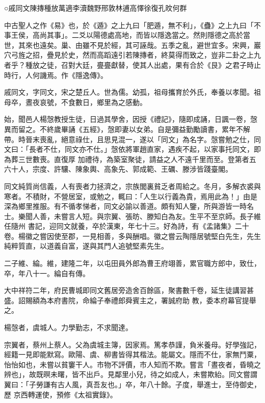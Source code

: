 
\begin{pinyinscope}

 ○戚同文陳摶種放萬適李瀆魏野邢敦林逋高懌徐復孔旼何群



 中古聖人之作《易》也，於《遁》之上九曰「肥遁，無不利」，《蠱》之上九曰「不事王侯，高尚其事」。二爻以陽德處高地，而皆以隱逸當之。然則隱德之高於當世，其來也遠矣。巢、由雖不見於經，其可誣哉。五季之亂，避世宜多。宋興，巖穴弓旌之招，疊見於史，然而高蹈遠引若陳摶者，終莫得而致之，豈非二卦之上九者乎？種放之徒，召對大廷，亹亹獻替，使其人出處，果有合於《艮》之君子時止時行，人何譏焉。作《隱逸傳》。



 戚同文，字同文，宋之楚丘人。世為儒。幼孤，祖母攜育於外氏，奉養以孝聞。祖母卒，晝夜哀號，不食數日，鄉里為之感動。



 始，聞邑人楊愨教授生徒，日過其學舍，因授《禮記》，隨即成誦，日諷一卷，愨異而留之。不終歲畢誦《五經》，愨即妻以女弟。自是彌益勤勵讀書，累年不解帶。時晉末喪亂，絕意祿仕，且思見混一，遂以「同文」為名字。愨嘗勉之仕，同文曰：「長者不仕，同文亦不仕。」愨依將軍趙直家，遇疾不起，以家事托同文，即為葬三世數喪。直復厚
 加禮待，為築室聚徒，請益之人不遠千里而至。登第者五六十人，宗度、許驤、陳象輿、高象先、郭成範、王礪、滕涉皆踐臺閣。



 同文純質尚信義，人有喪者力拯濟之，宗族閭裏貧乏者周給之。冬月，多解衣裘與寒者。不積財，不營居室，或勉之，輒曰：「人生以行義為貴，焉用此為！」由是深為鄉里推服。有不循孝悌者，同文必諭以善道。頗有知人鑒，所與游皆一時名士。樂聞人善，未嘗言人短。與宗翼、張昉、滕知白為友。生平不至京師。長子維任隨州
 書記，迎同文就養，卒於漢東，年七十三。好為詩，有《孟諸集》二十卷。楊徽之嘗因使至郡，一見相善，多與酬唱。徽之嘗云陶隱居號堅白先生，先生純粹質直，以道義自富，遂與其門人追號堅素先生。



 二子維、綸。維，建隆二年，以屯田員外郎為曹王府翊善，累官職方郎中，致仕，卒，年八十一。綸自有傳。



 大中祥符二年，府民曹城即同文舊居旁造舍百餘區，聚書數千卷，延生徒講習甚盛。詔賜額為本府書院，命綸子奉禮郎舜賓主之，署誠府助
 教，委本府幕官提舉之。



 楊愨者，虞城人。力學勤志，不求聞達。



 宗翼者，蔡州上蔡人。父為虞城主簿，因家焉。篤孝恭謹，負米養母。好學強記，經籍一見即能默寫。歐陽、虞、柳書皆得其楷法。能屬文。隱而不仕，家無鬥粟，怡怡如也，未嘗以貧窶干人。市物不評價，市人知而不欺。嘗言「晝夜者，昏曉之辨也」，故既暝未曙，皆不出戶。見鄰里小兒，待之如成人，未嘗欺紿。同文嘗謂翼曰：「子勞謙有古人風，真吾友也。」卒，年八十餘。子度，舉進士，至侍御史，歷
 京西轉運使，預修《太祖實錄》。




\end{pinyinscope}
